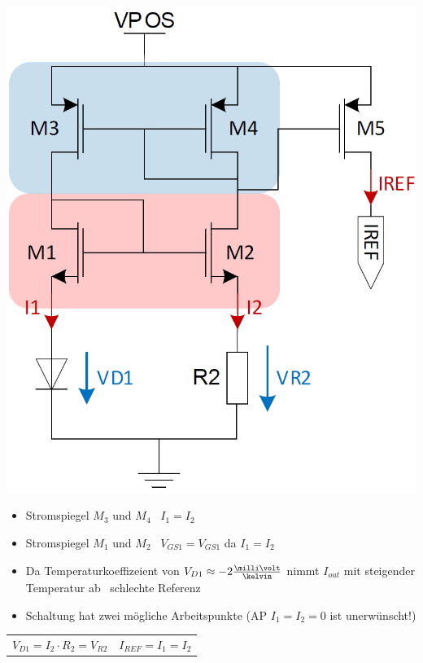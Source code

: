 \begin{minipage}[c]{0.27\columnwidth}
    \includegraphics[width=\columnwidth]{images/bootstrap.png}
\end{minipage}
\hfill
\begin{minipage}[c]{0.71\columnwidth}
    \begin{itemize}
        \item Stromspiegel $M_3$ und $M_4$ \textrightarrow\ $I_1 = I_2$
        \item Stromspiegel $M_1$ und $M_2$ \textrightarrow\ $V_{GS1} = V_{GS1}$ da $I_1 = I_2$
        \item Da Temperaturkoeffizeient von $V_{D1} \approx -2 \frac{\milli \volt}{\kelvin}$ nimmt $I_{out}$ mit steigender
            Temperatur ab \textrightarrow\ schlechte Referenz
        \item Schaltung hat zwei mögliche Arbeitspunkte (AP $I_1 = I_2 = 0$ ist unerwünscht!)
    \end{itemize}

    \vspace{0.2cm}
    \begin{tabular}{c c}
        $ \boxed{ V_{D1} = I_2 \cdot R_2 = V_{R2}} $ & $ \boxed{ I_{REF} = I_1 = I_2 } $
    \end{tabular}
\end{minipage}


